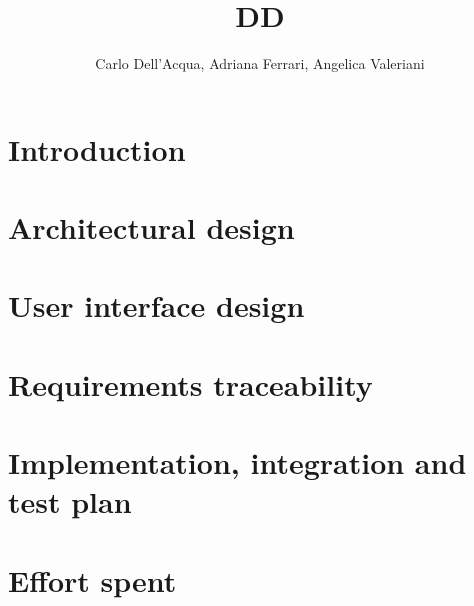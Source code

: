 \documentclass{report}
\begin{document}
  \title{DD}
  \author{Carlo Dell'Acqua, Adriana Ferrari, Angelica Valeriani}
  \maketitle

  \tableofcontents

  \chapter{Introduction}
  

  \chapter{Architectural design}
  

  \chapter{User interface design}
  
  
  \chapter{Requirements traceability}
  

  \chapter{Implementation, integration and test plan}
  
  
  \chapter{Effort spent}
  

  \begin{thebibliography}{0}
  \end{thebibliography}
\end{document}
